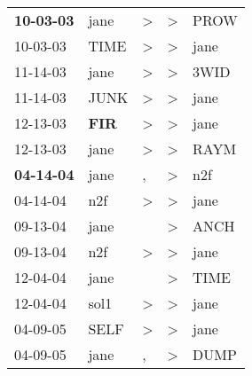 \begin{supertabular}{p{0.07\textwidth}p{0.06\textwidth}p{0.02\textwidth}p{0.02\textwidth}p{0.06\textwidth}}
 \textbf{10-03-03\textsuperscript{}} &           jane\textsuperscript{} &     \textgreater &     \textgreater &           PROW\textsuperscript{} \\
          10-03-03\textsuperscript{} &           TIME\textsuperscript{} &     \textgreater &     \textgreater &           jane\textsuperscript{} \\
          11-14-03\textsuperscript{} &           jane\textsuperscript{} &     \textgreater &     \textgreater &           3WID\textsuperscript{} \\
          11-14-03\textsuperscript{} &           JUNK\textsuperscript{} &     \textgreater &     \textgreater &           jane\textsuperscript{} \\
          12-13-03\textsuperscript{} &   \textbf{FIR\textsuperscript{}} &     \textgreater &     \textgreater &           jane\textsuperscript{} \\
          12-13-03\textsuperscript{} &           jane\textsuperscript{} &     \textgreater &     \textgreater &           RAYM\textsuperscript{} \\
 \textbf{04-14-04\textsuperscript{}} &           jane\textsuperscript{} &                , &     \textgreater &            n2f\textsuperscript{} \\
          04-14-04\textsuperscript{} &            n2f\textsuperscript{} &     \textgreater &     \textgreater &           jane\textsuperscript{} \\
          09-13-04\textsuperscript{} &           jane\textsuperscript{} &                  &     \textgreater &           ANCH\textsuperscript{} \\
          09-13-04\textsuperscript{} &            n2f\textsuperscript{} &     \textgreater &     \textgreater &           jane\textsuperscript{} \\
          12-04-04\textsuperscript{} &           jane\textsuperscript{} &                  &     \textgreater &           TIME\textsuperscript{} \\
          12-04-04\textsuperscript{} &           sol1\textsuperscript{} &     \textgreater &     \textgreater &           jane\textsuperscript{} \\
          04-09-05\textsuperscript{} &           SELF\textsuperscript{} &     \textgreater &     \textgreater &           jane\textsuperscript{} \\
          04-09-05\textsuperscript{} &           jane\textsuperscript{} &                , &     \textgreater &           DUMP\textsuperscript{} \\

\end{supertabular}

